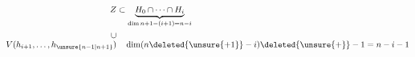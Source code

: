 \[
\begin{aligned}
Z&\subset\underbrace{H_0\cap\cdots\cap H_i}_{\dim n+1-(i+1)=n-i}\\
\cup&\\[-4pt]
V(h_{i+1},\ldots,h_{\unsure{n-1|n+1}})&\quad \dim(n\deleted{\unsure{+1}}-i)\deleted{\unsure{+}}-1=n-i-1
\end{aligned}
\]



